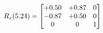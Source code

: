 \documentclass[preview]{standalone}
\begin{document}
\begin{align*}
\special{dvisvgm:raw <g id='unique000'>}R_{z}(5.24) = \begin{bmatrix}+0.50 & +0.87 & 0 \\-0.87 & +0.50 & 0 \\0 & 0 & 1\end{bmatrix}\special{dvisvgm:raw </g>}
\end{align*}
\end{document}
